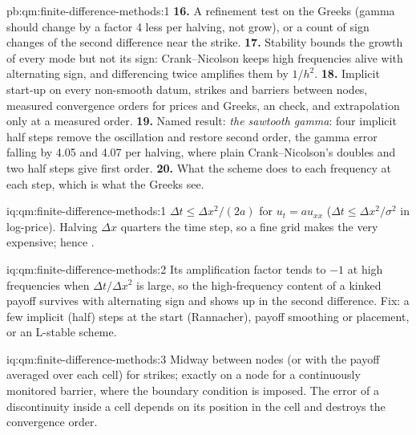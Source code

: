 \begin{solution}{pb:qm:finite-difference-methods:1}
\textbf{16.} A refinement test on the Greeks (gamma should change by a factor 4 less per halving, not grow), or a count of sign changes of the second difference near the strike.
\textbf{17.} Stability bounds the growth of every mode but not its sign: Crank--Nicolson keeps high frequencies alive with alternating sign, and differencing twice amplifies them by $1/h^2$.
\textbf{18.} Implicit start-up on every non-smooth datum, strikes and barriers between nodes, measured convergence orders for prices and Greeks, an  check, and extrapolation only at a measured order.
\textbf{19.} Named result: \emph{the sawtooth gamma}: four implicit half steps remove the oscillation and restore second order, the gamma error falling by 4.05 and 4.07 per halving, where plain Crank--Nicolson's
doubles and two half steps give first order.
\textbf{20.} What the scheme does to each frequency at each step, which is what the Greeks see.
\end{solution}

\begin{solution}{iq:qm:finite-difference-methods:1}
$\Delta t \le \Delta x^2/(2a)$ for $u_t = au_{xx}$ ($\Delta t \le \Delta x^2/\sigma^2$ in log-price). Halving $\Delta x$ quarters the time step, so a fine grid makes the  very expensive; hence .
\end{solution}

\begin{solution}{iq:qm:finite-difference-methods:2}
Its amplification factor tends to $-1$ at high frequencies when $\Delta t/\Delta x^2$ is large, so the high-frequency content of a kinked payoff survives with alternating sign and shows up in the second
difference. Fix: a few implicit (half) steps at the start (Rannacher), payoff smoothing or placement, or an L-stable scheme.
\end{solution}

\begin{solution}{iq:qm:finite-difference-methods:3}
Midway between nodes (or with the payoff averaged over each cell) for strikes; exactly on a node for a continuously monitored barrier, where the boundary condition is imposed. The error of a
discontinuity inside a cell depends on its position in the cell and destroys the convergence order.
\end{solution}

